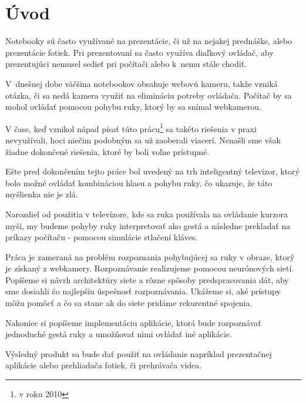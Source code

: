{}
{}
\chapter*{Úvod}\label{chap:intro}
Notebooky sú často využívané na prezentácie, či už na nejakej prednáške, alebo prezentácie fotiek. Pri prezentovaní sa často využíva diaľkový ovládač, aby prezentujúci nemusel sedieť pri počítači alebo k~nemu stále chodiť.

V~dnešnej dobe väčšina notebookov obsahuje webovú kameru, takže vzniká otázka, či sa nedá kamera využiť na elimináciu potreby ovládača. Počítač by sa mohol ovládať pomocou pohybu ruky, ktorý by sa snímal webkamerou.

V čase, keď vznikol nápad písať túto prácu\footnote{v roku 2010} sa takéto riešenia v praxi nevyužívali, hoci niečim podobným sa už zaoberali viacerí. Nenašli sme však žiadne dokončené riešenia, ktoré by boli voľne prístupné.

Ešte pred dokončením tejto práce bol uvedený na trh inteligentný televízor, ktorý bolo možné ovládať kombináciou hlasu a pohybu ruky, čo ukazuje, že táto myšlienka nie je zlá. 

Narozdiel od použitia v televízore, kde sa ruka používala na ovládanie kurzora myši, my budeme pohyby ruky interpretovať ako gestá a následne prekladať na príkazy počítaču - pomocou simulácie stlačení kláves.

Práca je zameraná na problém rozpoznania pohybujúcej sa ruky v obraze, ktorý je získaný z webkamery. Rozpoznávanie realizujeme pomocou neurónových sietí. Popíšeme si návrh architektúry siete a rôzne spôsoby predspracovania dát, aby sme dosiahli čo najlepšiu úspešnosť rozpoznávania. Ukážeme si, aké prístupy môžu pomôcť a čo sa stane ak do siete pridáme rekurentné spojenia. 

Nakoniec si popíšeme implementáciu aplikácie, ktorá bude rozpoznávať jednoduché gestá ruky a umožňovať nimi ovládať iné aplikácie.

Výsledný produkt sa bude dať použiť na ovládanie napríklad prezentačnej aplikácie alebo prehliadača fotiek, či prehrávača videa.